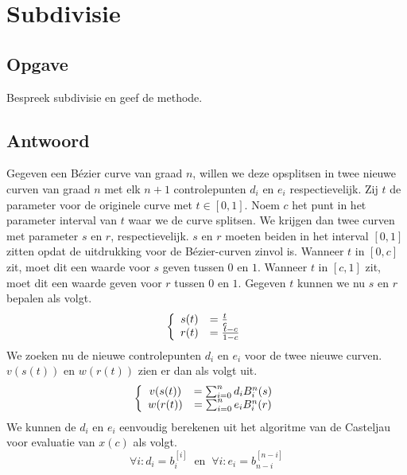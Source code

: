 \documentclass[examenvragen.tex]{subfiles}
\begin{document}
\section{Subdivisie}
\subsection{Opgave}
Bespreek subdivisie en geef de methode.

\subsection{Antwoord}
Gegeven een B\'ezier curve van graad $n$, willen we deze opsplitsen in twee nieuwe curven van graad $n$ met elk $n+1$ controlepunten $d_i$ en $e_i$ respectievelijk.
Zij $t$ de parameter voor de originele curve met $t \in [0,1]$. 
Noem $c$ het punt in het parameter interval van $t$ waar we de curve splitsen.
We krijgen dan twee curven met parameter $s$ en $r$, respectievelijk. $s$ en $r$ moeten beiden in het interval $[0,1]$ zitten opdat de uitdrukking voor de B\'ezier-curven zinvol is.
Wanneer $t$ in $[0,c]$ zit, moet dit een waarde voor $s$ geven tussen $0$ en $1$. Wanneer $t$ in $[c,1]$ zit, moet dit een waarde geven voor $r$ tussen $0$ en $1$.
Gegeven $t$ kunnen we nu $s$ en $r$ bepalen als volgt.
\[
\left\{
\begin{array}{c l}
s(t) &= \frac{t}{c}\\
r(t) &= \frac{t-c}{1-c}\\
\end{array}
\right.
\]
We zoeken nu de nieuwe controlepunten $d_i$ en $e_i$ voor de twee nieuwe curven. $v(s(t))$ en $w(r(t))$ zien er dan als volgt uit.
\[
\left\{
\begin{array}{c c}
v(s(t)) &= \sum_{i=0}^{n}d_iB^{n}_{i}(s)\\
w(r(t)) &= \sum_{i=0}^{n}e_iB^{n}_{i}(r)
\end{array}
\right.
\]
We kunnen de $d_i$ en $e_i$ eenvoudig berekenen uit het algoritme van de Casteljau voor evaluatie van $x(c)$ als volgt.
\[
\forall i: d_i = b_{i}^{[i]}\ \text{ en }\ \forall i: e_i = b_{n-i}^{[n-i]}
\]
\end{document}
